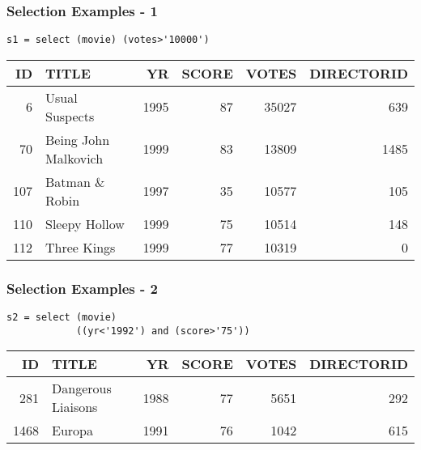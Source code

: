 \documentclass[dvipsnames]{beamer}
\theoremstyle{plain}
\begin{document}
\begin{frame}[fragile]
  \frametitle{Selection Examples - 1}

  \begin{example}
    \begin{lstlisting}
s1 = select (movie) (votes>'10000')
    \end{lstlisting}

    \pause
    \begin{tiny}
    \begin{table}
      \begin{tabular}{|r|l|r|r|r|r|}\hline
 ID & TITLE                &   YR & SCORE & VOTES & DIRECTORID\\\hline\hline
  6 & Usual Suspects       & 1995 &    87 & 35027 &        639\\\hline
 70 & Being John Malkovich & 1999 &    83 & 13809 &       1485\\\hline
107 & Batman \& Robin      & 1997 &    35 & 10577 &        105\\\hline
110 & Sleepy Hollow        & 1999 &    75 & 10514 &        148\\\hline
112 & Three Kings          & 1999 &    77 & 10319 &          0\\\hline
      \end{tabular}
    \end{table}
    \end{tiny}
  \end{example}
\end{frame}

\begin{frame}[fragile]
  \frametitle{Selection Examples - 2}

  \begin{example}
    \begin{lstlisting}
s2 = select (movie)
            ((yr<'1992') and (score>'75'))
    \end{lstlisting}

    \pause
    \begin{tiny}
    \begin{table}
      \begin{tabular}{|r|l|r|r|r|r|}\hline
  ID & TITLE              &   YR & SCORE & VOTES & DIRECTORID\\\hline\hline
 281 & Dangerous Liaisons & 1988 &    77 &  5651 &        292\\\hline
1468 & Europa             & 1991 &    76 &  1042 &        615\\\hline
      \end{tabular}
    \end{table}
    \end{tiny}
  \end{example}
\end{frame}
\end{document}
